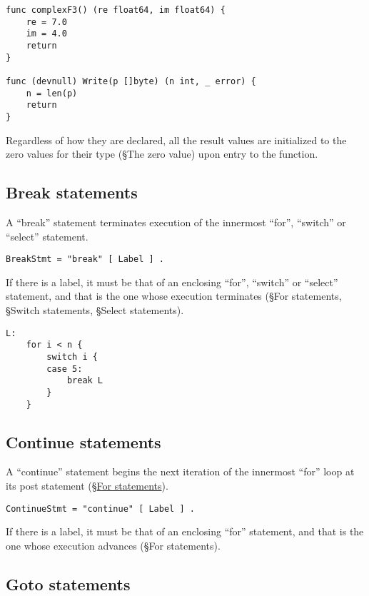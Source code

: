 {\begin{enumerate}
\begin{Verbatim}[frame=single]
func complexF3() (re float64, im float64) {
    re = 7.0
    im = 4.0
    return
}

func (devnull) Write(p []byte) (n int, _ error) {
    n = len(p)
    return
}
\end{Verbatim}
\end{enumerate}

Regardless of how they are declared, all the result values are
initialized to the zero values for their type
(§The zero value) upon entry to the
function.

\subsection*{Break statements}

A ``break'' statement terminates execution of the innermost ``for'',
``switch'' or ``select'' statement.

\begin{Verbatim}[frame=single]
BreakStmt = "break" [ Label ] .
\end{Verbatim}

If there is a label, it must be that of an enclosing ``for'', ``switch''
or ``select'' statement, and that is the one whose execution terminates
(§For statements,
§Switch statements,
§Select statements).

\begin{Verbatim}[frame=single]
L:
    for i < n {
        switch i {
        case 5:
            break L
        }
    }
\end{Verbatim}

\subsection*{Continue statements}

A ``continue'' statement begins the next iteration of the innermost
``for'' loop at its post statement (§\hyperref[For\_statements]{For
statements}).

\begin{Verbatim}[frame=single]
ContinueStmt = "continue" [ Label ] .
\end{Verbatim}

If there is a label, it must be that of an enclosing ``for'' statement,
and that is the one whose execution advances
(§For statements).

\subsection*{Goto statements}

}
